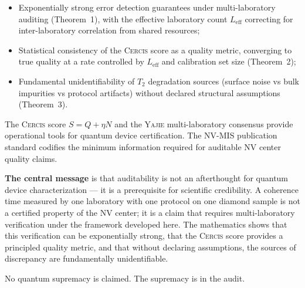 \documentclass[11pt,a4paper]{article}
\newcommand{\eff}{\mathrm{eff}}
\theoremstyle{definition}
\newcommand{\Yajie}{\textsc{Yajie}}
\newcommand{\Cercis}{\textsc{Cercis}}
\newcommand{\Ttwo}{T_2}
\newcommand{\NV}{NV}
\begin{document}
\begin{itemize}[nosep]
    \item Exponentially strong error detection guarantees under multi-laboratory
    auditing (Theorem~1), with the effective laboratory count $L_{\eff}$
    correcting for inter-laboratory correlation from shared resources;
    \item Statistical consistency of the \Cercis{} score as a quality metric,
    converging to true quality at a rate controlled by $L_{\eff}$ and
    calibration set size (Theorem~2);
    \item Fundamental unidentifiability of $\Ttwo$ degradation sources
    (surface noise vs bulk impurities vs protocol artifacts) without
    declared structural assumptions (Theorem~3).
\end{itemize}

The \Cercis{} score $S = Q + \eta N$ and the \Yajie{} multi-laboratory
consensus provide operational tools for quantum device certification.
The NV-MIS publication standard codifies the minimum information required
for auditable \NV{} center quality claims.

\textbf{The central message} is that auditability is not an afterthought
for quantum device characterization — it is a prerequisite for scientific
credibility. A coherence time measured by one laboratory with one protocol
on one diamond sample is not a certified property of the \NV{} center;
it is a claim that requires multi-laboratory verification under the
framework developed here. The mathematics shows that this verification
can be exponentially strong, that the \Cercis{} score provides a principled
quality metric, and that without declaring assumptions, the sources of
discrepancy are fundamentally unidentifiable.

No quantum supremacy is claimed. The supremacy is in the audit.
\end{document}
